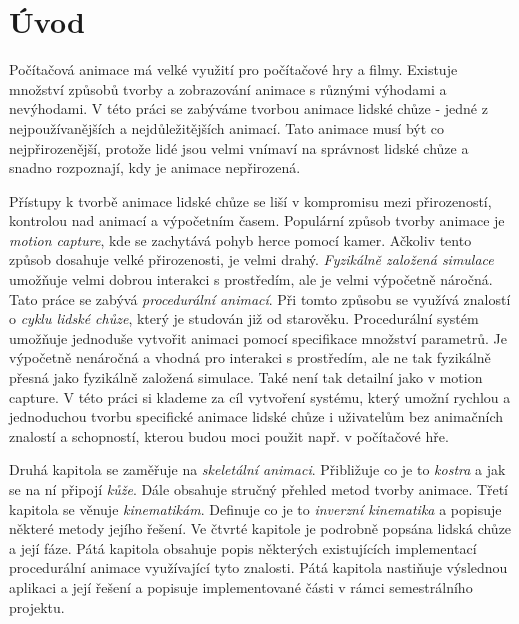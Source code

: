 
\chapter{Úvod}
Počítačová animace má velké využití pro počítačové hry a filmy. Existuje množství způsobů tvorby a zobrazování animace s různými výhodami a nevýhodami. V této práci se zabýváme tvorbou animace lidské chůze - jedné z nejpoužívanějších a nejdůležitějších animací. Tato animace musí být co nejpřirozenější, protože lidé jsou velmi vnímaví na správnost lidské chůze a snadno rozpoznají, kdy je animace nepřirozená.

Přístupy k tvorbě animace lidské chůze se liší v kompromisu mezi přirozeností, kontrolou nad animací a výpočetním časem. Populární způsob tvorby animace je \textit{motion capture}, kde se zachytává pohyb herce pomocí kamer. Ačkoliv tento způsob dosahuje velké přirozenosti, je velmi drahý. \textit{Fyzikálně založená simulace} umožňuje velmi dobrou interakci s prostředím, ale je velmi výpočetně náročná. Tato práce se zabývá \textit{procedurální animací}. Při tomto způsobu se využívá znalostí o \textit{cyklu lidské chůze}, který je studován již od starověku. Procedurální systém umožňuje jednoduše vytvořit animaci pomocí specifikace množství parametrů. Je výpočetně nenáročná a vhodná pro interakci s prostředím, ale ne tak fyzikálně přesná jako fyzikálně založená simulace. Také není tak detailní jako v motion capture.  V této práci si klademe za cíl vytvoření systému, který umožní rychlou a jednoduchou tvorbu specifické animace lidské chůze i uživatelům bez animačních znalostí a schopností, kterou budou moci použit např. v počítačové hře.

Druhá kapitola se zaměřuje na \textit{skeletální animaci}. Přibližuje co je to \textit{kostra} a jak se na ní připojí \textit{kůže}. Dále obsahuje stručný přehled metod tvorby animace. Třetí kapitola se věnuje \textit{kinematikám}. Definuje co je to \textit{inverzní kinematika} a popisuje některé metody jejího řešení. Ve čtvrté kapitole je podrobně popsána lidská chůze a její fáze. Pátá kapitola obsahuje popis některých existujících implementací procedurální animace využívající tyto znalosti. Pátá kapitola nastiňuje výslednou aplikaci a její řešení a popisuje implementované části v rámci semestrálního projektu.

